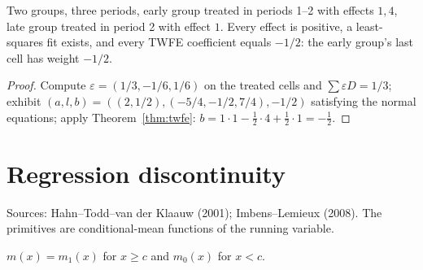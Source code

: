 \begin{proposition}
\label{prop:twfe-negative}
\leanok
{}
Two groups, three periods, early group treated in periods 1--2 with effects $1, 4$, late group treated in period 2
with effect $1$. Every effect is positive, a least-squares fit exists, and every TWFE coefficient equals $-1/2$:
the early group's last cell has weight $-1/2$.
\end{proposition}
\begin{proof}
\leanok
Compute $\varepsilon = (1/3, -1/6, 1/6)$ on the treated cells and $\sum\varepsilon D = 1/3$; exhibit $(a, l, b) =
((2, 1/2), (-5/4, -1/2, 7/4), -1/2)$ satisfying the normal equations; apply Theorem~\ref{thm:twfe}:
$b = 1\cdot 1 - \tfrac12\cdot 4 + \tfrac12\cdot 1 = -\tfrac12$.
\end{proof}

\section{Regression discontinuity}
\label{sec:rd}

Sources: Hahn--Todd--van der Klaauw (2001); Imbens--Lemieux (2008). The primitives are conditional-mean functions of the
running variable.

\begin{definition}[Sharp RD]
\label{def:sharp-rd}
\leanok
$m(x) = m_1(x)$ for $x \ge c$ and $m_0(x)$ for $x < c$.
\end{definition}

